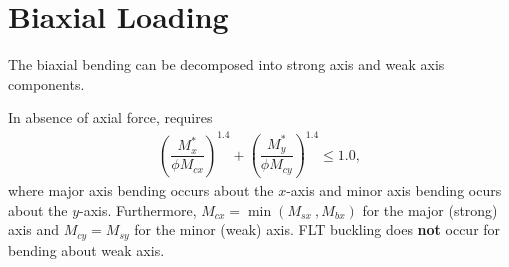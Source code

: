 \section{Biaxial Loading}
The biaxial bending can be decomposed into strong axis and weak axis components.
\begin{figure}[H]
\centering
\end{figure}
In absence of axial force,  requires
\begin{align}
\left(\dfrac{M^*_x}{\phi{}M_{cx}}\right)^{1.4}+\left(\dfrac{M^*_y}{\phi{}M_{cy}}\right)^{1.4}\leqslant1.0,
\end{align}
where major axis bending occurs about the $x$-axis and minor axis bending ocurs about the $y$-axis. Furthermore, $M_{cx}=\min\left(M_{sx}~,M_{bx}\right)$ for the major (strong) axis and $M_{cy}=M_{sy}$ for the minor (weak) axis. FLT buckling does \textbf{not} occur for bending about weak axis.
\begin{figure}[H]
\centering
\end{figure}

